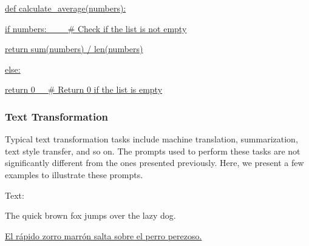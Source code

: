 \vspace{0.5em}
\begin{tcolorbox}

\begingroup
\setlength{\leftskip}{2em}
\setlength{\rightskip}{2em}


\vspace{0.7em}


\uline{def calculate\_average(numbers):}

\hspace{2em} \uline{if numbers:\ \ \ \ \ \# Check if the list is not empty}

\hspace{2em} \hspace{2em} \uline{return sum(numbers) / len(numbers)}

\hspace{2em} \uline{else:}

\hspace{2em} \hspace{2em} \uline{return 0\ \ \ \# Return 0 if the list is empty}

\endgroup

\end{tcolorbox}
\vspace{0.5em}

\subsubsection{Text Transformation}

\noindent Typical text transformation tasks include machine translation, summarization, text style transfer, and so on. The prompts used to perform these tasks are not significantly different from the ones presented previously. Here, we present a few examples to illustrate these prompts.

\vspace{0.5em}
\begin{tcolorbox}

\begingroup
\setlength{\leftskip}{2em}
\setlength{\rightskip}{2em}


\vspace{0.7em}

Text:
\vspace{0.3em}

The quick brown fox jumps over the lazy dog.

\vspace{0.7em}

\underline{El r{\'a}pido zorro marr{\'o}n salta sobre el perro perezoso.}

\endgroup

\end{tcolorbox}
\vspace{0.5em}


